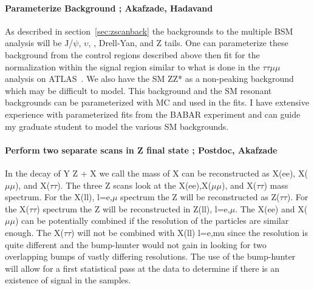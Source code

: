 \paragraph{Parameterize Background ;  Akafzade, Hadavand} %
As described in section~\ref{sec:zscanback} the backgrounds to the multiple BSM analysis  will be J/$\psi$, $\upsilon$, \ttbar, Drell-Yan, and Z tails.  One can 
parameterize these background from the control regions described above then fit for the normalization within the signal region similar to what is done in the
$\tau\tau \mu \mu$ analysis on ATLAS~\cite{tautaumumu}.  We also have the SM ZZ* as a non-peaking background which may be difficult to model. This background and the SM resonant backgrounds 
can be parameterized with MC and used in the fits. I have extensive experience with parameterized fits from the BABAR experiment and can guide my graduate student to model the various SM backgrounds.

\paragraph{Perform two separate scans in Z final state ;  Postdoc, Akafzade} %
In the decay of Y \too Z + X we call the mass of X can be reconstructed as X(ee), X($\mu\mu$), and X($\tau\tau$).  
The three Z scans look at the X(ee),X($\mu\mu$), and X($\tau\tau$) mass spectrum. For the X(ll), l=e,$\mu$ spectrum the Z will be reconstructed as Z($\tau\tau$).  For the X($\tau\tau$) spectrum the Z will be reconstructed in Z(ll), l=e,$\mu$.  
The X(ee) and X($\mu\mu$) can be potentially combined if the resolution of the particles are similar enough.  The X($\tau\tau$) will not be combined with X(ll) l=e,mu since the resolution is quite different and the bump-hunter would not gain in looking for two overlapping bumps of vastly differing resolutions.
The use of the bump-hunter will allow for a first statistical pass at the data to determine if there is an existence of signal in the samples.  


